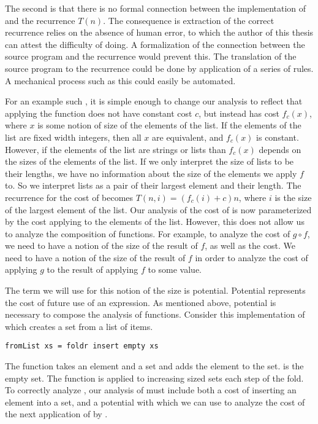 The second is that there is no formal connection between the implementation of
 and the recurrence $T(n)$. The consequence is extraction of the correct
recurrence relies on the absence of human error, to which the author of this
thesis can attest the difficulty of doing. A formalization of the connection
between the source program and the recurrence would prevent this. The
translation of the source program to the recurrence could be done by
application of a series of rules. A mechanical process such as this could
easily be automated.



For an example such , it is simple enough to change our analysis to
reflect that applying the function  does not have constant cost $c$, but
instead has cost $f_c(x)$, where $x$ is some notion of size of the elements of
the list. If the elements of the list are fixed width integers, then all $x$
are equivalent, and $f_c(x)$ is constant. However, if the elements of the list
are strings or lists than $f_c(x)$ depends on the sizes of the elements of the
list.  If we only interpret the size of lists to be their lengths, we have no
information about the size of the elements we apply $f$ to. So we interpret
lists as a pair of their largest element and their length. The recurrence for
the cost of  becomes $T(n,i) = (f_c(i) + c)n$, where $i$ is the size of
the largest element of the list. Our analysis of the cost of  is now
parameterized by the cost applying  to the elements of the list. However,
this does not allow us to analyze the composition of functions. For example, to
analyze the cost of $g \circ f$, we need to have a notion of the size of the
result of $f$, as well as the cost. We need to have a notion of the size of the
result of $f$ in order to analyze the cost of applying $g$ to the result of
applying $f$ to some value.


The term we will use for this notion of the size is potential.  Potential
represents the cost of future use of an expression. As mentioned above,
potential is necessary to compose the analysis of functions. Consider this
implementation of  which creates a set from a list of items.
%
\begin{lstlisting}
fromList xs = foldr insert empty xs
\end{lstlisting}
%
The  function takes an element and a set and adds the element to the
set.  is the empty set. The  function is applied to
increasing sized sets each step of the fold. To correctly analyze ,
our analysis of  must include both a cost of inserting an element
into a set, and a potential with which we can use to analyze the cost of the
next application of  by .



